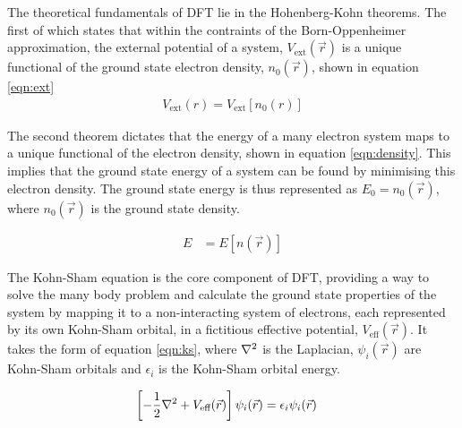\documentclass[10pt,a4paper,twocolumn,twoside]{extarticle}
\begin{document}
The theoretical fundamentals of DFT lie in the Hohenberg-Kohn theorems.
The first of which states that within the contraints of the Born-Oppenheimer approximation, the external potential of a system, $V_{\text{ext}}(\vec{r})$ is a unique functional of the ground state electron density, $n_0(\vec{r})$, shown in equation \ref{eqn:ext}
\begin{align}
	\label{eqn:ext}
	V_{\text{ext}}(r) = V_{\text{ext}}[n_0(r)] 
\end{align}

The second theorem dictates that the energy of a many electron system maps to a unique functional of the electron density, shown in equation \ref{eqn:density}. This implies that the ground state energy of a system can be found  by minimising this electron density. The ground state energy is thus represented as ${E_0 = n_0(\vec{r})}$, where $n_0(\vec{r})$ is the ground state density.  

\begin{align}
	\label{eqn:density}
	E &= E[n(\vec{r})]
\end{align}




The Kohn-Sham equation is the core component of DFT, providing a way to solve the many body problem and calculate the ground state properties of the system by mapping it to a non-interacting system of electrons, each represented by its own Kohn-Sham orbital, in a fictitious effective potential, $V_\text{eff}(\vec{r})$. It takes the form of equation \ref{eqn:ks}, where $\laplacian$ is the Laplacian, $\psi_i(\vec{r})$ are Kohn-Sham orbitals and $\epsilon_i$ is the Kohn-Sham orbital energy. 

\begin{align}
	\left[-\frac{1}{2}\laplacian + V_\text{eff}(\vec{r})\right]\psi_i(\vec{r}) &= \epsilon_i \psi_i(\vec{r}) 	
	\label{eqn:ks}
\end{align}
\end{document}
